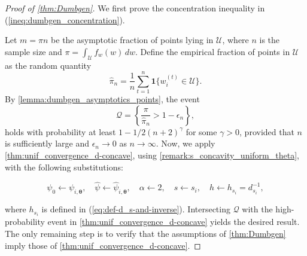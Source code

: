 \documentclass{article} %
\def\eqref#1{equation~\ref{#1}}
\renewcommand{\eqref}[1]{(\ref{#1})}
\begin{document}
\begin{proof}[Proof of \cref{thm:Dumbgen}]

We first prove the concentration inequality in \eqref{ineq:dumbgen_concentration}.

Let \( m = \pi n \) be the asymptotic fraction of points lying in \( \mathcal{U} \), where \( n \) is the sample size and \( \pi = \int_{\mathcal{U}} f_w(w) \,dw \). Define the empirical fraction of points in \( \mathcal{U} \) as the random quantity 
\[
\hat{\pi}_n = \frac{1}{n} \sum_{t=1}^{n} \mathbf{1} \{ w^{(t)}_i \in \mathcal{U} \}.
\]
By \cref{lemma:dumbgen_asymptotics_points}, the event 
\[
\mathscr{Q} = \left\{ \frac{\pi}{\hat{\pi}_n} > 1 - \epsilon_n \right\},
\]
holds with probability at least \( 1 - 1/2(n+2)^{\gamma} \) for some \( \gamma > 0 \), provided that \( n \) is sufficiently large and \( \epsilon_n \to 0 \) as \( n \to \infty \). Now, we apply \cref{thm:unif_convergence_d-concave}, using \cref{remark:s_concavity_uniform_theta}, with the following substitutions: 

\[
\psi_0 \leftarrow \psi_{i,\boldsymbol{\theta}}, \quad \widehat{\psi} \leftarrow \widehat{\psi}_{i,\boldsymbol{\theta}}, \quad \alpha \leftarrow 2, \quad s \leftarrow s_i, \quad h \leftarrow h_{s_i} = d_{s_i}^{-1},
\]

where $h_{s_i}$ is defined in \eqref{eq:def-d_s-and-inverse}. Intersecting $\mathscr{Q}$ with the high-probability event in \cref{thm:unif_convergence_d-concave} yields the desired result. The only remaining step is to verify that the assumptions of \cref{thm:Dumbgen} imply those of \cref{thm:unif_convergence_d-concave}.


\end{proof}
\end{document}
